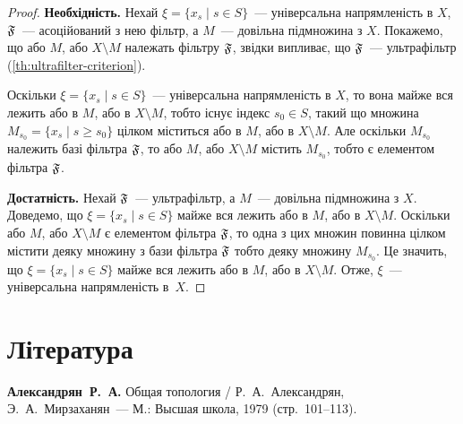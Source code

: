 \begin{proof}
    \textbf{Необхідність.} Нехай $\xi = \{x_s \mid s \in S\}$~--- універсальна напрямленість в $X$, $\frak F$~--- асоційований з нею фільтр, а $M$~--- довільна підмножина з $X$. Покажемо, що або $M$, або $X \setminus M$ належать фільтру $\frak F$, звідки випливає, що $\frak F$~--- ультрафільтр (\cref{th:ultrafilter-criterion}). \medskip
    
    Оскільки $\xi = \{x_s \mid s \in S\}$~--- універсальна напрямленість в $X$, то вона майже вся лежить або в $M$, або в $X \setminus M$, тобто існує індекс $s_0 \in S$, такий що множина $M_{s_0} = \{x_s \mid s \ge s_0\}$ цілком міститься або в $M$, або в $X \setminus M$. Але оскільки $M_{s_0}$ належить базі фільтра $\frak F$, то або $M$, або $X \setminus M$ містить $M_{s_0}$, тобто є елементом фільтра $\frak F$. \medskip
    
    \textbf{Достатність.} Нехай $\frak F$~--- ультрафільтр, а $M$~--- довільна підмножина з $X$. Доведемо, що $\xi = \{x_s \mid s \in S\}$ майже вся лежить або в $M$, або в $X \setminus M$. Оскільки або $M$, або $X \setminus M$ є елементом фільтра $\frak F$, то одна з цих множин повинна цілком містити деяку множину з бази фільтра $\frak F$ тобто деяку множину $M_{s_0}$. Це значить, що $\xi = \{x_s \mid s \in S\}$ майже вся лежить або в $M$, або в $X \setminus M$. Отже, $\xi$~--- універсальна напрямленість в~$X$.
\end{proof}

\section{Література}

\begin{enumerate}[label={[\arabic*]}]
\item \textbf{Александрян~Р.~А.}
Общая топология /
Р.~А.~Александрян, Э.~А.~Мирзаханян~---
М.: Высшая школа, 1979 (стр.~101--113).
\end{enumerate}
